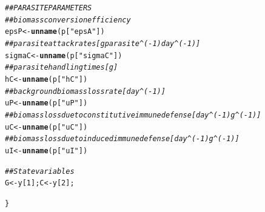 \documentclass[11pt,reqno,final,pdftex]{amsart}\usepackage[]{graphicx}\usepackage[]{color}
\makeatletter
\newcommand{\hlstr}[1]{\textcolor[rgb]{0.192,0.494,0.8}{#1}}%
\newcommand{\hlcom}[1]{\textcolor[rgb]{0.678,0.584,0.686}{\textit{#1}}}%
\newcommand{\hlkwd}[1]{\textcolor[rgb]{0.737,0.353,0.396}{\textbf{#1}}}%
\newenvironment{kframe}{%
 \def\at@end@of@kframe{}%
 \ifinner\ifhmode%
  \def\at@end@of@kframe{\end{minipage}}%
  \begin{minipage}{\columnwidth}%
 \fi\fi%
 \def\FrameCommand##1{\hskip\@totalleftmargin \hskip-\fboxsep
 \colorbox{shadecolor}{##1}\hskip-\fboxsep
     \hskip-\linewidth \hskip-\@totalleftmargin \hskip\columnwidth}%
 \MakeFramed {\advance\hsize-\width
   \@totalleftmargin\z@ \linewidth\hsize
   \@setminipage}}%
 {\par\unskip\endMakeFramed%
 \at@end@of@kframe}
\newenvironment{knitrout}{}{} %
\theoremstyle{plain}
\numberwithin{equation}{part}
\makeatother
\begin{document}
\begin{knitrout}
\begin{kframe}
\begin{alltt}
\hlcom{    ## PARASITE PARAMETERS}
\hlcom{    ## biomass conversion efficiency}
    epsP <- \hlkwd{unname}(p[\hlstr{"epsA"}])
\hlcom{    ## parasite attack rates [g parasite^(-1) day^(-1)]}
    sigmaC <- \hlkwd{unname}(p[\hlstr{"sigmaC"}])
\hlcom{    ## parasite handling times [g]}
    hC <- \hlkwd{unname}(p[\hlstr{"hC"}])
\hlcom{    ## background biomass loss rate [day^(-1)]}
    uP <- \hlkwd{unname}(p[\hlstr{"uP"}])
\hlcom{    ## biomass loss due to constitutive immune defense [day^(-1) g^(-1)]}
    uC <- \hlkwd{unname}(p[\hlstr{"uC"}])
\hlcom{    ## biomass loss due to induced immune defense [day^(-1) g^(-1)]}
    uI <- \hlkwd{unname}(p[\hlstr{"uI"}])

\hlcom{    ## State variables}
    G <- y[1]; C <- y[2];




\}
\end{alltt}
\end{kframe}
\end{knitrout}




\end{document}

